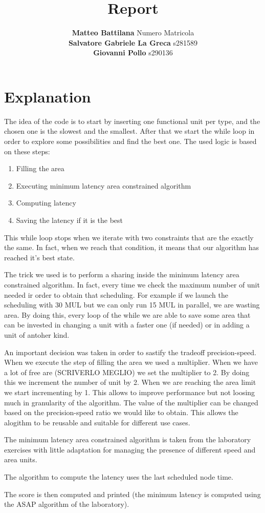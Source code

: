 \documentclass{article}
\title{\Huge Report}
\author{
\large \textbf{Matteo Battilana} Numero Matricola \\
\large \textbf{Salvatore Gabriele La Greca} s281589 \\
\large \textbf{Giovanni Pollo} s290136}
\date{}
\begin{document}
\begin{titlepage}
    \centering
    \vspace{2px}
  \end{titlepage}
  \maketitle
  \thispagestyle{empty}

  \newpage

  \thispagestyle{empty}

  \section{Explanation}
  The idea of the code is to start by inserting one functional unit per type, and the chosen one is the slowest and the smallest. 
  After that we start the while loop in order to explore some possibilities and find the best one. The used logic is based on these steps:
  \begin{enumerate}
      \item Filling the area
      \item Executing minimum latency area constrained algorithm
      \item Computing latency
      \item Saving the latency if it is the best
  \end{enumerate}

  This while loop stops when we iterate with two constraints that are the exactly the same. In fact, when we reach that condition, it means that our algorithm has reached it's best state. 

  The trick we used is to perform a sharing inside the minimum latency area constrained algorithm. In fact, every time we check the maximum number of unit needed ir order to obtain that scheduling. For example if we launch the scheduling with 30 MUL but we can only run 15 MUL in parallel, we are wasting area. By doing this, every loop of the while we are able to save some area that can be invested in changing a unit with a faster one (if needed) or in adding a unit of antoher kind.

  An important decision was taken in order to sastify the tradeoff precision-speed. When we execute the step of filling the area we used a multiplier. When we have a lot of free are (SCRIVERLO MEGLIO) we set the multiplier to 2. By doing this we increment the number of unit by 2. When we are reaching the area limit we start incrementing by 1. This allows to improve performance but not loosing much in granularity of the algorithm. The value of the multiplier can be changed based on the precision-speed ratio we would like to obtain. This allows the alogithm to be reusable and suitable for different use cases. 

  The minimum latency area constrained algorithm is taken from the laboratory exercises with little adaptation for managing the presence of different speed and area units. 

  The algorithm to compute the latency uses the last scheduled node time. 

  The score is then computed and printed (the minimum latency is computed using the ASAP algorithm of the laboratory).

  
\end{document}
